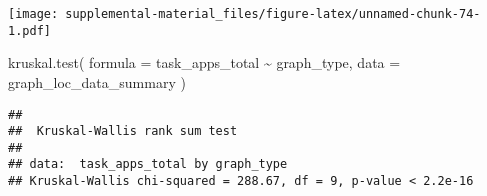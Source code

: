 \documentclass[
]{book}
\newenvironment{Shaded}{\begin{snugshade}}{\end{snugshade}}
\newcommand{\AttributeTok}[1]{\textcolor[rgb]{0.77,0.63,0.00}{#1}}
\newcommand{\ConstantTok}[1]{\textcolor[rgb]{0.00,0.00,0.00}{#1}}
\newcommand{\FunctionTok}[1]{\textcolor[rgb]{0.00,0.00,0.00}{#1}}
\newcommand{\NormalTok}[1]{#1}
\newcommand{\OtherTok}[1]{\textcolor[rgb]{0.56,0.35,0.01}{#1}}
\newcommand{\SpecialCharTok}[1]{\textcolor[rgb]{0.00,0.00,0.00}{#1}}
\newcommand{\StringTok}[1]{\textcolor[rgb]{0.31,0.60,0.02}{#1}}
\begin{document}
\texttt{[image: supplemental-material\_files/figure-latex/unnamed-chunk-74-1.pdf]}

\begin{Shaded}
\begin{Highlighting}[]
\FunctionTok{kruskal.test}\NormalTok{(}
  \AttributeTok{formula =}\NormalTok{ task\_apps\_total }\SpecialCharTok{\textasciitilde{}}\NormalTok{ graph\_type,}
  \AttributeTok{data =}\NormalTok{ graph\_loc\_data\_summary}
\NormalTok{)}
\end{Highlighting}
\end{Shaded}

\begin{verbatim}
## 
##  Kruskal-Wallis rank sum test
## 
## data:  task_apps_total by graph_type
## Kruskal-Wallis chi-squared = 288.67, df = 9, p-value < 2.2e-16
\end{verbatim}

\begin{Shaded}
\end{Shaded}
\end{document}
